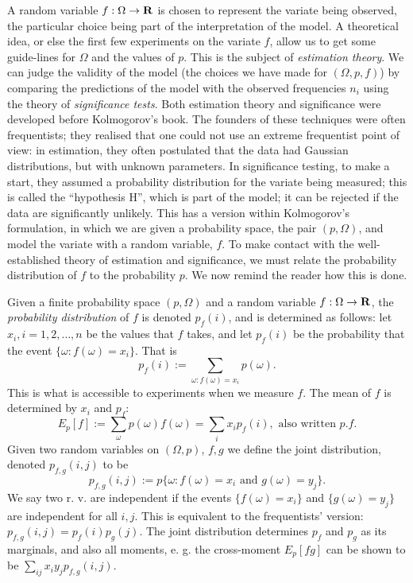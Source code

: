 \documentclass[12pt]{article}
\begin{document}
A random variable $f:\Omega
\rightarrow{\bf R}$ is chosen to
represent the variate being observed, the particular choice being
part of the interpretation of the model. A theoretical idea, or else
the first few experiments on the variate $f$, allow us to get some
guide-lines for $\Omega$ and
the values of $p$. This is the subject of {\em estimation
theory}. We can judge the validity of the model (the choices we have made
for $(\Omega,p,f)$) by comparing the predictions of the model with the
observed frequencies $n_i$
using the theory of {\em significance tests}. Both estimation theory and
significance were developed before Kolmogorov's book. The
founders of these techniques were often frequentists; they realised
that one could not use an extreme frequentist
point of view: in estimation, they often postulated that the data had
Gaussian distributions, but with unknown parameters. In significance
testing, to make a start, they assumed a probability distribution
for the variate being measured; this is called the ``hypothesis H'',
which is part of the model; it can be rejected
if the data are significantly unlikely. This
has a version within Kolmogorov's formulation, in which we are given a
probability space, the pair $(p,\Omega)$, and model the variate with
a random variable, $f$.
To make contact with the well-established theory of estimation
and significance, we must relate the probability distribution of $f$
to the probability $p$. We now remind the reader how this is done.

Given a finite probability space $(p,\Omega)$ and a
random variable $f:\Omega\rightarrow {\bf R}$, the {\em probability
distribution} of $f$ is denoted $p_f(i)$, and is determined as follows:
let $x_i, i=1,2,\ldots,n$ be the values that
$f$ takes, and let $p_f(i)$ be the probability that the event $\{\omega:f
(\omega)=x_i\}$. That is
\begin{equation}
p_f(i):=\sum_{\omega:f(\omega)=x_i}p(\omega).
\end{equation}
This is what is accessible to experiments when we measure $f$.
The mean of $f$ is determined by $x_i$ and $p_f$:
\begin{equation}
E_p[f]:=\sum_\omega p(\omega)f(\omega)=\sum_i x_ip_f(i),
\mbox{ also written }p.f.
\label{mean}
\end{equation}
Given two random variables on $(\Omega,p)$, $f,g$ we define the joint
distribution, denoted $p_{f,g}(i,j)$ to be
\begin{equation}
p_{f,g}(i,j):=p\{\omega:f(\omega)=x_i\mbox{ and }g(\omega)=y_j\}.
\end{equation}
We say two r. v. are independent if the events $\{f(\omega)=x_i\}$ and
$\{g(\omega)=y_j\}$ are independent for all $i,j$. This is equivalent to
the frequentists' version: $p_{f,g}(i,j)=p_f(i)p_g(j)$.
The joint distribution determines $p_f$ and $p_g$ as its marginals,
and also all moments, e. g. the cross-moment $E_p[fg]$
can be shown to be $\sum_{ij}x_iy_jp_{f,g}(i,j).$
\end{document}
